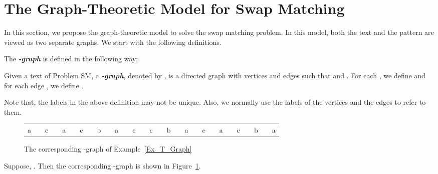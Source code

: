 \documentclass{llncs}
\begin{document}
\section{\label{Model}The Graph-Theoretic Model for Swap Matching}In this section, we propose the graph-theoretic model to solve the swap matching problem. In this model, both the text and the pattern are viewed as two separate graphs. We start with the following definitions.

\begin{definition}
The \textbf{\emph{-graph}} is defined in the following way:


Given a text  of Problem SM, a
\textbf{\emph{-graph}}, denoted by ,
is a directed graph with  vertices and  edges such that  and . For each
, we define  and for each edge , we define .
\end{definition}


Note that, the labels in the above definition may not be unique.
Also, we normally use the labels of the vertices and the edges to
refer to them.

\begin{figure}[h!]
\begin{center}

\begin{tabular}{ccccccccccccccccccccccccccccc}
a&&c&&a&&c&&b&&a&&c&&c&&b&&a&&c&&a&&c&&b&&a\\
\end{tabular}
 \caption{The corresponding -graph of Example~\ref{Ex_T_Graph}}
\label{Fig_T_Graph}
\end{center}
\end{figure}

\begin{example}\label{Ex_T_Graph}
Suppose, . Then the corresponding -graph is
shown in Figure~\ref{Fig_T_Graph}.
\end{example}
\end{document}
